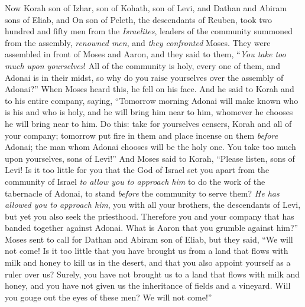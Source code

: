 \begin{biblechapter} %
 Now Korah son of Izhar, son of Kohath, son of Levi, and Dathan and Abiram sons of Eliab, and On son of Peleth, the descendants of Reuben,
\verse took two hundred and fifty men from the \textit{Israelites}, leaders of the community summoned from the assembly, \textit{renowned men}, and \textit{they confronted} Moses.
\verse They were assembled in front of Moses and Aaron, and they said to them, “\textit{You take too much upon yourselves}! All of the community is holy, every one of them, and Adonai is in their midst, so why do you raise yourselves over the assembly of Adonai?”
\verse When Moses heard this, he fell on his face.
\verse And he said to Korah and to his entire company, saying, “Tomorrow morning Adonai will make known who is his and who is holy, and he will bring him near to him, whomever he chooses he will bring near to him.
\verse Do this: take for yourselves censers, Korah and all of your company;
\verse tomorrow put fire in them and place incense on them \textit{before} Adonai; the man whom Adonai chooses will be the holy one. You take too much upon yourselves, sons of Levi!”
\verse And Moses said to Korah, “Please listen, sons of Levi!
\verse Is it too little for you that the God of Israel set you apart from the community of Israel \textit{to allow you to approach him} to do the work of the tabernacle of Adonai, to stand \textit{before} the community to serve them?
\verse \textit{He has allowed you to approach him}, you with all your brothers, the descendants of Levi, but yet you also seek the priesthood.
\verse Therefore you and your company that has banded together against Adonai. What is Aaron that you grumble against him?”
\verse Moses sent to call for Dathan and Abiram son of Eliab, but they said, “We will not come!
\verse Is it too little that you have brought us from a land that flows with milk and honey to kill us in the desert, and that you also appoint yourself as a ruler over us?
\verse Surely, you have not brought us to a land that flows with milk and honey, and you have not given us the inheritance of fields and a vineyard. Will you gouge out the eyes of these men? We will not come!”

\end{biblechapter}
